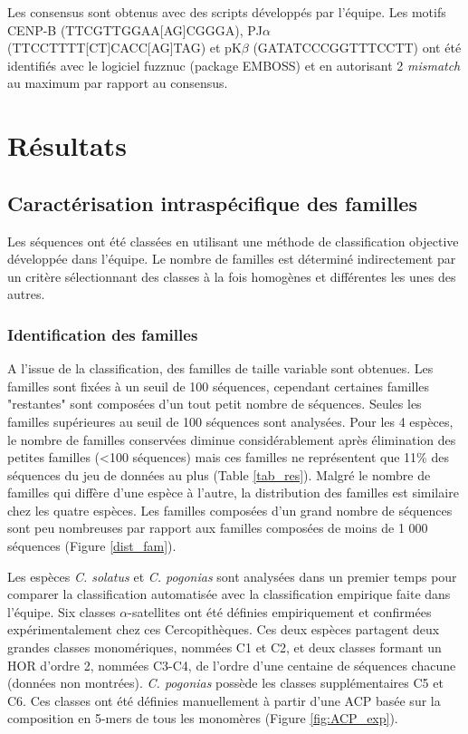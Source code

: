 \documentclass[12pt,a4paper]{article}
\begin{document}
Les consensus sont obtenus avec des scripts développés par l'équipe. Les motifs CENP-B (TTCGTTGGAA[AG]CGGGA), PJ$\alpha$ (TTCCTTTT[CT]CACC[AG]TAG) et pK$\beta$ (GATATCCCGGTTTCCTT) ont été identifiés avec le logiciel fuzznuc (package EMBOSS) \cite{Rice2000} et en autorisant 2 \textit{mismatch} au maximum par rapport au consensus.

\section{Résultats}
	\subsection{Caractérisation intraspécifique des familles}
	Les séquences ont été classées en utilisant une méthode de classification objective développée dans l'équipe. Le nombre de familles est déterminé indirectement par un critère sélectionnant des classes à la fois homogènes et différentes les unes des autres.
	
			\subsubsection{Identification des familles}
			
			A l'issue de la classification, des familles de taille variable sont obtenues. Les familles sont fixées à un seuil de 100 séquences, cependant certaines familles "restantes" sont composées d'un tout petit nombre de séquences. Seules les familles supérieures au seuil de 100 séquences sont analysées. Pour les 4 espèces, le nombre de familles conservées diminue considérablement après élimination des petites familles (<100 séquences) mais ces familles ne représentent que 11\% des séquences du jeu de données au plus (Table \ref{tab_res}).  Malgré le nombre de familles qui diffère d'une espèce à l'autre, la distribution des familles est similaire chez les quatre espèces. Les familles composées d'un grand nombre de séquences sont peu nombreuses par rapport aux familles composées de moins de 1 000 séquences (Figure \ref{dist_fam}). 

	Les espèces \textit{C. solatus} et \textit{C. pogonias} sont analysées dans un premier temps pour comparer la classification automatisée avec la classification empirique faite dans l'équipe. Six classes $\alpha$-satellites ont été définies empiriquement et confirmées expérimentalement chez ces Cercopithèques. Ces deux espèces partagent deux grandes classes monomériques, nommées C1 et C2, et deux classes formant un HOR d'ordre 2, nommées C3-C4, de l'ordre d'une centaine de séquences chacune (données non montrées). \textit{C. pogonias} possède les classes supplémentaires C5 et C6. Ces classes ont été définies manuellement à partir d'une ACP basée sur la composition en 5-mers de tous les monomères (Figure \ref{fig:ACP_exp}). 
	
\end{document}

